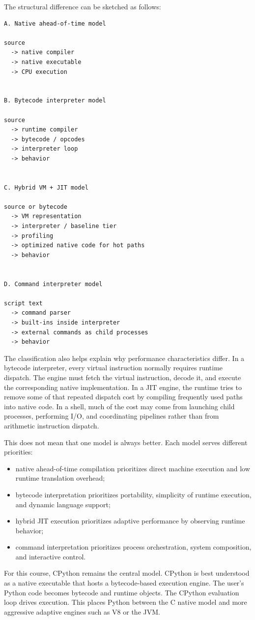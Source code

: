 The structural difference can be sketched as follows:

\begin{verbatim}
A. Native ahead-of-time model

source
  -> native compiler
  -> native executable
  -> CPU execution


B. Bytecode interpreter model

source
  -> runtime compiler
  -> bytecode / opcodes
  -> interpreter loop
  -> behavior


C. Hybrid VM + JIT model

source or bytecode
  -> VM representation
  -> interpreter / baseline tier
  -> profiling
  -> optimized native code for hot paths
  -> behavior


D. Command interpreter model

script text
  -> command parser
  -> built-ins inside interpreter
  -> external commands as child processes
  -> behavior
\end{verbatim}

The classification also helps explain why performance characteristics differ. In a bytecode interpreter, every virtual instruction normally requires runtime dispatch. The engine must fetch the virtual instruction, decode it, and execute the corresponding native implementation. In a JIT engine, the runtime tries to remove some of that repeated dispatch cost by compiling frequently used paths into native code. In a shell, much of the cost may come from launching child processes, performing I/O, and coordinating pipelines rather than from arithmetic instruction dispatch.

This does not mean that one model is always better. Each model serves different priorities:

\begin{itemize}
    \item native ahead-of-time compilation prioritizes direct machine execution and low runtime translation overhead;
    \item bytecode interpretation prioritizes portability, simplicity of runtime execution, and dynamic language support;
    \item hybrid JIT execution prioritizes adaptive performance by observing runtime behavior;
    \item command interpretation prioritizes process orchestration, system composition, and interactive control.
\end{itemize}

For this course, CPython remains the central model. CPython is best understood as a native executable that hosts a bytecode-based execution engine. The user's Python code becomes bytecode and runtime objects. The CPython evaluation loop drives execution. This places Python between the C native model and more aggressive adaptive engines such as V8 or the JVM.

